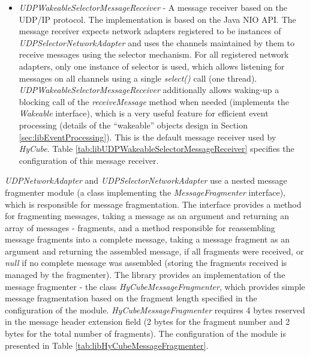 \begin{itemize}
	\item \emph{UDPWakeableSelectorMessageReceiver} - A message receiver based on the UDP/IP protocol. The implementation is based on the Java NIO API. The message receiver expects network adapters registered to be instances of \emph{UDPSelectorNetworkAdapter} and uses the channels maintained by them to receive messages using the selector mechanism. For all registered network adapters, only one instance of selector is used, which allows listening for messages on all channels using a single \emph{select()} call (one thread). \emph{UDPWakeableSelectorMessageReceiver} additionally allows waking-up a blocking call of the \emph{receiveMessage} method when needed (implements the \emph{Wakeable} interface), which is a very useful feature for efficient event processing (details of the ``wakeable'' objects design in Section \ref{sec:libEventProcessing}). This is the default message receiver used by \emph{HyCube}. Table \ref{tab:libUDPWakeableSelectorMessageReceiver} specifies the configuration of this message receiver.
	
	
\end{itemize}

\emph{UDPNetworkAdapter} and \emph{UDPSelectorNetworkAdapter} use a nested message fragmenter module (a class implementing the \emph{MessageFragmenter} interface), which is responsible for message fragmentation. The interface provides a method for fragmenting messages, taking a message as an argument and returning an array of messages - fragments, and a method responsible for reassembling message fragments into a complete message, taking a message fragment as an argument and returning the assembled message, if all fragments were received, or \emph{null} if no complete message was assembled (storing the fragments received is managed by the fragmenter). The library provides an implementation of the message fragmenter - the class \emph{HyCubeMessageFragmenter}, which provides simple message fragmentation based on the fragment length specified in the configuration of the module. \emph{HyCubeMessageFragmenter} requires 4 bytes reserved in the message header extension field (2 bytes for the fragment number and 2 bytes for the total number of fragments). The configuration of the module is presented in Table \ref{tab:libHyCubeMessageFragmenter}.


